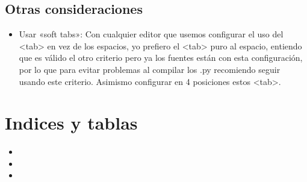 \documentclass[a4paper,12pt,spanish]{sphinxmanual}
\begin{document}
\section{Otras consideraciones}
\label{\detokenize{desarrollo:otras-consideraciones}}\begin{itemize}
\item {} 
Usar «soft tabs»: Con cualquier editor que usemos configurar el uso del \textless{}tab\textgreater{} en vez de los espacios, yo prefiero el \textless{}tab\textgreater{}
puro al espacio, entiendo que es válido el otro criterio pero ya los fuentes están con esta configuración, por lo que para
evitar problemas al compilar los .py recomiendo seguir usando este criterio. Asimismo configurar en 4 posiciones estos \textless{}tab\textgreater{}.

\end{itemize}


\chapter{Indices y tablas}
\label{\detokenize{index:indices-y-tablas}}\begin{itemize}
\item {} 

\item {} 

\item {} 

\end{itemize}
\end{document}
